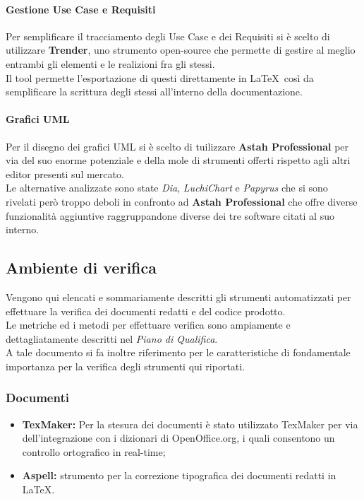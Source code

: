       \paragraph{Gestione Use Case e Requisiti}
        Per semplificare il tracciamento degli Use Case e dei Requisiti si è scelto di utilizzare \textbf{Trender}, uno strumento open-source che permette
        di gestire al meglio entrambi gli elementi e le realizioni fra gli stessi.\\
        Il tool permette l'esportazione di questi direttamente in \LaTeX\ così da semplificare la scrittura degli stessi all'interno della documentazione.
    \paragraph{Grafici UML}
      Per il disegno dei grafici UML si è scelto di tuilizzare \textbf{Astah Professional} per via del suo enorme potenziale e della mole di strumenti offerti
      rispetto agli altri editor presenti sul mercato.\\
      Le alternative analizzate sono state \emph{Dia}, \emph{LuchiChart} e \emph{Papyrus} che si sono rivelati però troppo deboli in confronto ad \textbf{Astah Professional} che offre
      diverse funzionalità aggiuntive raggruppandone diverse dei tre software citati al suo interno.
  \subsection{Ambiente di verifica}
    Vengono qui elencati e sommariamente descritti gli strumenti automatizzati per effettuare la verifica dei documenti redatti e del codice prodotto.\\
    Le metriche ed i metodi per effettuare verifica sono ampiamente e dettagliatamente descritti nel \emph{Piano di Qualifica}.\\
    A tale documento si fa inoltre riferimento per le caratteristiche di fondamentale importanza per la verifica degli strumenti qui riportati.
    \subsubsection{Documenti}
      \begin{itemize}
        \item \textbf{TexMaker: }Per la stesura dei documenti è stato utilizzato TexMaker per via dell'integrazione con i dizionari di OpenOffice.org, i quali consentono un controllo ortografico in real-time;
        \item \textbf{Aspell: }strumento per la correzione tipografica dei documenti redatti in \LaTeX.
      \end{itemize}
